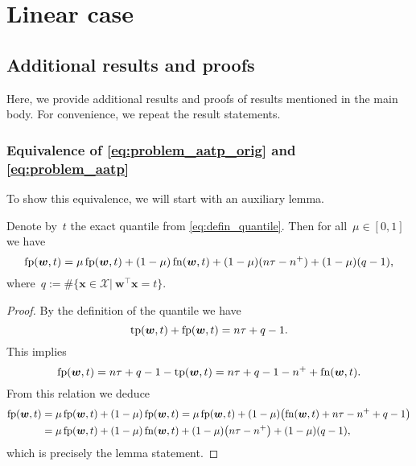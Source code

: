 \chapter{Linear case}

\section{Additional results and proofs}\label{app: proofs primal}

Here, we provide additional results and proofs of results mentioned in the main body. For convenience, we repeat the result statements.

\subsection{Equivalence of \eqref{eq:problem_aatp_orig} and \eqref{eq:problem_aatp}}

To show this equivalence, we will start with an auxiliary lemma.

\begin{lemma}\label{lemma:fnfp_equivalence}
  Denote by~$t$ the exact quantile from \eqref{eq:defin_quantile}. Then for all~$\mu\in[0,1]$ we have
  \begin{equation}\label{eq:fnfp_equivalence}
  \operatorname{fp} (\bm{w},t) = \mu \operatorname{fp}(\bm{w},t) + (1-\mu)\operatorname{fn}(\bm{w},t) + (1-\mu)(n\tau - n^+) + (1-\mu)(q - 1),
  \end{equation}
  where~$q:= \#\{\bm{x} \in\mathcal X|\ \bm{w}^\top \bm{x}= t\}$.
\end{lemma}

\begin{proof}
  By the definition of the quantile we have
  \begin{equation*}
    \operatorname{tp}(\bm{w},t)+\operatorname{fp}(\bm{w},t) = n\tau + q-1.
  \end{equation*}
  This implies
  \begin{equation*}
    \operatorname{fp}(\bm{w},t)=n\tau +q - 1-\operatorname{tp}(\bm{w},t) =n\tau+q-1-n^{+} +\operatorname{fn}(\bm{w},t).
  \end{equation*}
  From this relation we deduce
  \begin{equation*}
    \begin{aligned}
      \fp(\bm{w},t) &= \mu \fp(\bm{w},t) + (1-\mu)\fp(\bm{w},t) = \mu \fp(\bm{w},t) + (1-\mu)\left(\fn(\bm{w},t) + n\tau - n^+ + q - 1\right)\\
      &= \mu \fp(\bm{w},t) + (1-\mu)\fn(\bm{w},t) + (1-\mu)\left(n\tau - n^+\right) + (1-\mu)\left(q - 1\right),
    \end{aligned}
  \end{equation*}
  which is precisely the lemma statement.
\end{proof}

